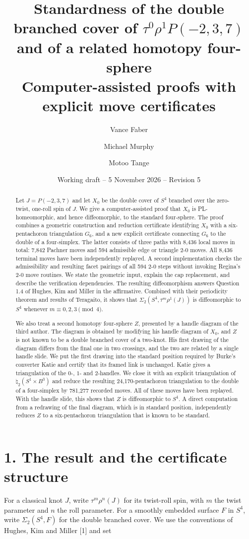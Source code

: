 \documentclass[11pt,letterpaper]{article}
\title{Standardness of the double branched cover of $\tau^0\rho^1P(-2,3,7)$\\ and of a related homotopy four-sphere\\[0.4em]\large Computer-assisted proofs with explicit move certificates}
\author{Vance Faber \and Michael Murphy \and Motoo Tange}
\date{Working draft -- 5 November 2026 -- Revision 5}
\begin{document}
\maketitle
\begin{abstract}
Let $J=P(-2,3,7)$ and let $X_0$ be the double cover of $S^4$ branched over the zero-twist, one-roll spin of $J$. We give a computer-assisted proof that $X_0$ is PL-homeomorphic, and hence diffeomorphic, to the standard four-sphere. The proof combines a geometric construction and reduction certificate identifying $X_0$ with a six-pentachoron triangulation $G_6$, and a new explicit certificate connecting $G_6$ to the double of a four-simplex. The latter consists of three paths with 8,436 local moves in total: 7,842 Pachner moves and 594 admissible edge or triangle 2-0 moves. All 8,436 terminal moves have been independently replayed. A second implementation checks the admissibility and resulting facet pairings of all 594 2-0 steps without invoking Regina's 2-0 move routines. We state the geometric input, explain the cap replacement, and describe the verification dependencies. The resulting diffeomorphism answers Question 1.4 of Hughes, Kim and Miller in the affirmative. Combined with their periodicity theorem and results of Teragaito, it shows that $\Sigma_2(S^4,\tau^m\rho^1(J))$ is diffeomorphic to $S^4$ whenever $m\equiv0,2,3\pmod4$.

We also treat a second homotopy four-sphere $Z$, presented by a handle diagram of the third author. The diagram is obtained by modifying his handle diagram of $X_0$, and $Z$ is not known to be a double branched cover of a two-knot. His first drawing of the diagram differs from the final one in two crossings, and the two are related by a single handle slide. We put the first drawing into the standard position required by Burke's converter Katie and certify that its framed link is unchanged. Katie gives a triangulation of the $0$-, $1$- and $2$-handles. We close it with an explicit triangulation of $\natural_2(S^1\times B^3)$ and reduce the resulting 24,170-pentachoron triangulation to the double of a four-simplex by 781,277 recorded moves. All of these moves have been replayed. With the handle slide, this shows that $Z$ is diffeomorphic to $S^4$. A direct computation from a redrawing of the final diagram, which is in standard position, independently reduces $Z$ to a six-pentachoron triangulation that is known to be standard.
\end{abstract}
\section*{1. The result and the certificate structure}
For a classical knot $J$, write $\tau^m\rho^n(J)$ for its twist-roll spin, with $m$ the twist parameter and $n$ the roll parameter. For a smoothly embedded surface $F$ in $S^4$, write $\Sigma_2(S^4,F)$ for the double branched cover. We use the conventions of Hughes, Kim and Miller [1] and set
\end{document}
